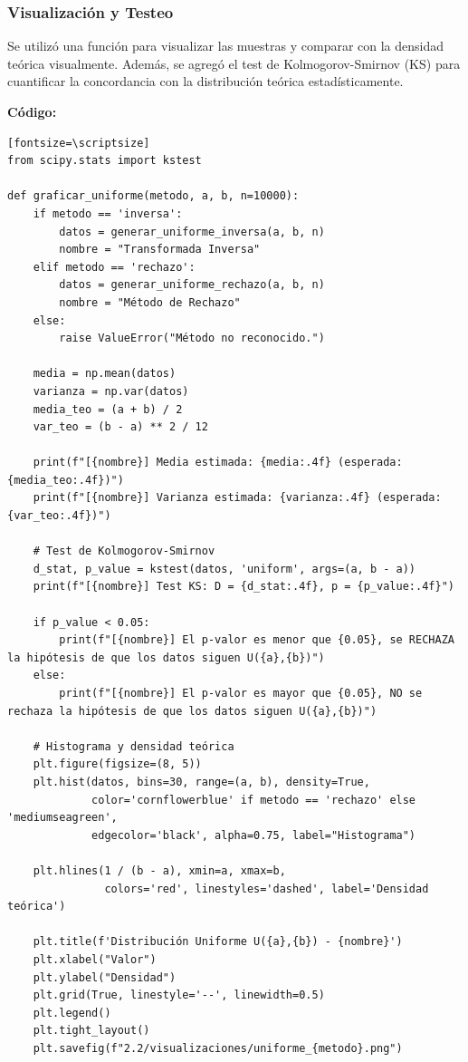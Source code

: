 \documentclass{article}
\begin{document}
\vspace{0.5em}
\subsubsection{Visualización y Testeo}

Se utilizó una función para visualizar las muestras y comparar con la densidad teórica visualmente. Además, se agregó el test de Kolmogorov-Smirnov (KS) para cuantificar la concordancia con la distribución teórica estadísticamente.

\textbf{Código:}
\begin{verbatim}[fontsize=\scriptsize]
from scipy.stats import kstest

def graficar_uniforme(metodo, a, b, n=10000):
    if metodo == 'inversa':
        datos = generar_uniforme_inversa(a, b, n)
        nombre = "Transformada Inversa"
    elif metodo == 'rechazo':
        datos = generar_uniforme_rechazo(a, b, n)
        nombre = "Método de Rechazo"
    else:
        raise ValueError("Método no reconocido.")

    media = np.mean(datos)
    varianza = np.var(datos)
    media_teo = (a + b) / 2
    var_teo = (b - a) ** 2 / 12

    print(f"[{nombre}] Media estimada: {media:.4f} (esperada: {media_teo:.4f})")
    print(f"[{nombre}] Varianza estimada: {varianza:.4f} (esperada: {var_teo:.4f})")

    # Test de Kolmogorov-Smirnov
    d_stat, p_value = kstest(datos, 'uniform', args=(a, b - a))
    print(f"[{nombre}] Test KS: D = {d_stat:.4f}, p = {p_value:.4f}")

    if p_value < 0.05:
        print(f"[{nombre}] El p-valor es menor que {0.05}, se RECHAZA la hipótesis de que los datos siguen U({a},{b})")
    else:
        print(f"[{nombre}] El p-valor es mayor que {0.05}, NO se rechaza la hipótesis de que los datos siguen U({a},{b})")

    # Histograma y densidad teórica
    plt.figure(figsize=(8, 5))
    plt.hist(datos, bins=30, range=(a, b), density=True,
             color='cornflowerblue' if metodo == 'rechazo' else 'mediumseagreen',
             edgecolor='black', alpha=0.75, label="Histograma")

    plt.hlines(1 / (b - a), xmin=a, xmax=b,
               colors='red', linestyles='dashed', label='Densidad teórica')

    plt.title(f'Distribución Uniforme U({a},{b}) - {nombre}')
    plt.xlabel("Valor")
    plt.ylabel("Densidad")
    plt.grid(True, linestyle='--', linewidth=0.5)
    plt.legend()
    plt.tight_layout()
    plt.savefig(f"2.2/visualizaciones/uniforme_{metodo}.png")
\end{verbatim}
\end{document}
